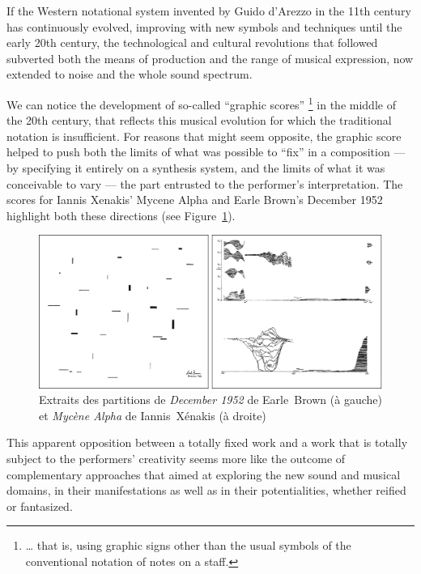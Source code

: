 If the Western notational system invented by Guido d'Arezzo in the 11th century has continuously evolved, improving with new symbols and techniques until the early 20th century, the technological and cultural revolutions that followed subverted both the means of production and the range of musical expression, now extended to noise and the whole sound spectrum.

We can notice the development of so-called “graphic scores” \footnote{… that is, using graphic signs other than the usual symbols of the conventional notation of notes on a staff.} in the middle of the 20th century, that reflects this musical evolution for which the traditional notation is insufficient. For reasons that might seem opposite, the graphic score helped to push both the limits of what was possible to “fix” in a composition — by specifying it entirely on a synthesis system, and the limits of what it was conceivable to vary — the part entrusted to the performer's interpretation. The scores for Iannis Xenakis' Mycene Alpha and Earle Brown's December 1952 highlight both these directions (see Figure \ref{fig:notation:brown-xenakis}).

\begin{figure}[htb]
	\includegraphics[width=\textwidth]{gfx/notation/Brown-Xenakis-Paysage.png}
	\caption{Extraits des partitions de \textit{December 1952} de Earle Brown (à gauche) et \textit{Mycène Alpha} de Iannis Xénakis (à droite)}
	\label{fig:notation:brown-xenakis}
\end{figure}

This apparent opposition between a totally fixed work and a work that is totally subject to the performers' creativity seems more like the outcome of complementary approaches that aimed at exploring the new sound and musical domains, in their manifestations as well as in their potentialities, whether reified or fantasized.

